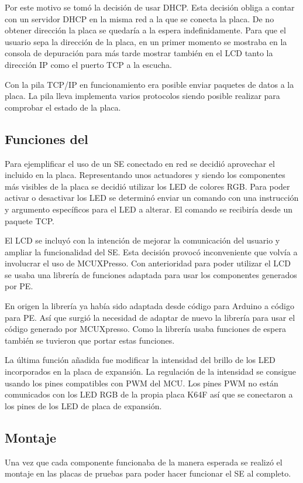 Por este motivo se tomó la decisión de usar DHCP. Esta decisión
obliga a contar con un servidor DHCP en la misma red a la que se conecta la
placa. De no obtener dirección la placa se quedaría a la espera indefinidamente.
Para que el usuario sepa la dirección de la placa, en un primer momento se
mostraba en la consola de depuración para más tarde mostrar también en el LCD
tanto la dirección IP como el puerto TCP a la escucha.

Con la pila TCP/IP en funcionamiento era posible enviar paquetes de datos a la
placa. La pila lleva implementa varios protocolos siendo posible realizar
 para comprobar el estado de la placa.

\subsection{Funciones del }{\label{sec:desarrollo-hw}}
Para ejemplificar el uso de un SE conectado en red se decidió aprovechar el
 incluido en la placa. Representando unos actuadores y 
siendo los componentes más visibles de la placa se decidió utilizar los LED de
colores RGB. Para poder activar o desactivar los LED se determinó enviar un
comando con una instrucción y argumento específicos para el LED a alterar. El
comando se recibiría desde un paquete TCP.

El LCD se incluyó con la intención de mejorar la comunicación del usuario y
ampliar la funcionalidad del SE. Esta decisión provocó inconveniente que volvía
a involucrar el uso de MCUXPresso. Con anterioridad para poder utilizar el LCD
se usaba una librería de funciones adaptada para usar los componentes generados
por PE. 

En origen la librería ya había sido adaptada desde código para Arduino a
código para PE. Así que surgió la necesidad de adaptar de nuevo la librería para
usar el código generado por MCUXpresso. Como la librería usaba funciones de
espera también se tuvieron que portar estas funciones.

La última función añadida fue modificar la intensidad del brillo de los LED
incorporados en la placa de expansión. La regulación de la intensidad se
consigue usando los pines compatibles con PWM del MCU. Los pines PWM no
están comunicados con los LED RGB de la propia placa K64F así que se conectaron
a los pines de los LED de placa de expansión.

\subsection{Montaje }{\label{sec:desarrollo-montaje}}
Una vez que cada componente funcionaba de la manera esperada se realizó
el montaje en las placas de pruebas para poder hacer funcionar el SE al
completo. 

